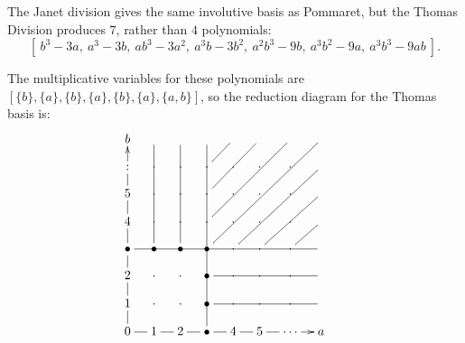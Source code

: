 \documentclass[a4paper,11pt]{report}
\begin{document}
{{\begin{Verbatim}[commandchars=!@|,fontsize=\small,frame=single,label=Example]
\end{Verbatim}
 The Janet division gives the same involutive basis as Pommaret, but the Thomas
Division produces $7$, rather than $4$ polynomials: 
\[ [~ b^3-3a,\ a^3-3b,\ ab^3-3a^2,\ a^3b-3b^2,\ a^2b^3-9b,\ a^3b^2-9a,\
a^3b^3-9ab ~]. \]
 

 The multiplicative variables for these polynomials are $[ \{b\}, \{a\}, \{b\}, \{a\}, \{b\}, \{a\}, \{a,b\} ]$, so the reduction diagram for the Thomas basis is: 
\[ \vcenter{\xymatrix@=1em{ b & & & & & & & & \\ : \ar[u] & \cdot & \cdot & \cdot
\ar@{-}[ur] & \cdot & \cdot & \cdot & & \\ 5 \ar@{-}[u] & \cdot & \cdot &
\cdot \ar@{-}[uurr] & \cdot & \cdot & \cdot & & \\ 4 \ar@{-}[u] & \cdot &
\cdot & \cdot \ar@{-}[uuurrr] & \cdot & \cdot & \cdot & & \\ \bullet
\ar@{-}[u] \ar@{-}[rrrrrrr] & \bullet \ar@{-}[uuuu] & \bullet \ar@{-}[uuuu] &
\bullet \ar@{-}[uuuurrrr] & \cdot \ar@{-}[uuurrr] & \cdot \ar@{-}[uurr] &
\cdot \ar@{-}[ur] & & \\ 2 \ar@{-}[u] & \cdot & \cdot & \bullet \ar@{-}[rrrr]
& \cdot & \cdot & \cdot & & \\ 1 \ar@{-}[u] & \cdot & \cdot & \bullet
\ar@{-}[rrrr] & \cdot & \cdot & \cdot & & \\ 0 \ar@{-}[r]\ar@{-}[u] & 1
\ar@{-}[r] & 2 \ar@{-}[r] & \bullet \ar@{-}[r] \ar@{-}[uuuuuuu] & 4 \ar@{-}[r]
& 5 \ar@{-}[r] & \cdots \ar[r] & a & }} \]
 }

 }

         
\end{document}
